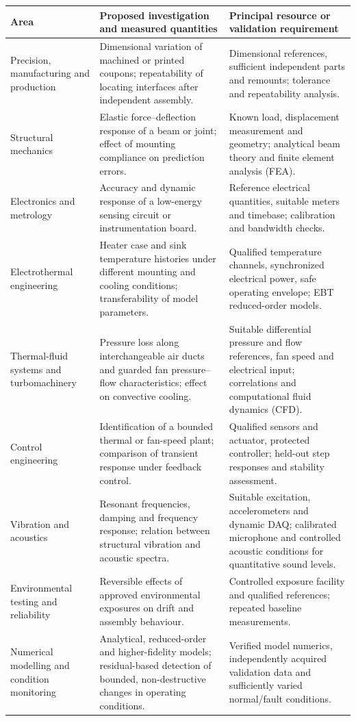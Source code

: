 \documentclass[11pt,a4paper]{article}
\begin{document}
\begingroup\small\setlength{\tabcolsep}{5pt}\renewcommand{\arraystretch}{1.25}
\begin{tabularx}{\textwidth}{@{}>{\raggedright\arraybackslash}p{}>{\raggedright\arraybackslash}X>{\raggedright\arraybackslash}p{}@{}}
\toprule
Area & Proposed investigation and measured quantities & Principal resource or validation requirement\\
\midrule
Precision, manufacturing and production & Dimensional variation of machined or printed coupons; repeatability of locating interfaces after independent assembly. & Dimensional references, sufficient independent parts and remounts; tolerance and repeatability analysis.\\
Structural mechanics & Elastic force--deflection response of a beam or joint; effect of mounting compliance on prediction errors. & Known load, displacement measurement and geometry; analytical beam theory and finite element analysis (FEA).\\
Electronics and metrology & Accuracy and dynamic response of a low-energy sensing circuit or instrumentation board. & Reference electrical quantities, suitable meters and timebase; calibration and bandwidth checks.\\
Electrothermal engineering & Heater case and sink temperature histories under different mounting and cooling conditions; transferability of model parameters. & Qualified temperature channels, synchronized electrical power, safe operating envelope; EBT reduced-order models.\\
Thermal-fluid systems and turbomachinery & Pressure loss along interchangeable air ducts and guarded fan pressure--flow characteristics; effect on convective cooling. & Suitable differential pressure and flow references, fan speed and electrical input; correlations and computational fluid dynamics (CFD).\\
Control engineering & Identification of a bounded thermal or fan-speed plant; comparison of transient response under feedback control. & Qualified sensors and actuator, protected controller; held-out step responses and stability assessment.\\
Vibration and acoustics & Resonant frequencies, damping and frequency response; relation between structural vibration and acoustic spectra. & Suitable excitation, accelerometers and dynamic DAQ; calibrated microphone and controlled acoustic conditions for quantitative sound levels.\\
Environmental testing and reliability & Reversible effects of approved environmental exposures on drift and assembly behaviour. & Controlled exposure facility and qualified references; repeated baseline measurements.\\
Numerical modelling and condition monitoring & Analytical, reduced-order and higher-fidelity models; residual-based detection of bounded, non-destructive changes in operating conditions. & Verified model numerics, independently acquired validation data and sufficiently varied normal/fault conditions.\\
\bottomrule
\end{tabularx}
\end{document}
